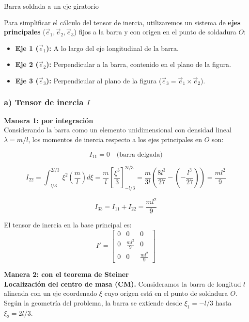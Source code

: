 \begin{solucion}{Barra soldada a un eje giratorio}

Para simplificar el cálculo del tensor de inercia, utilizaremos un sistema de \textbf{ejes principales} ($\vec{e}_1, \vec{e}_2, \vec{e}_3$) fijos a la barra y con origen en el punto de soldadura $O$:
\begin{itemize}
    \item \textbf{Eje 1 ($\vec{e}_1$):} A lo largo del eje longitudinal de la barra.
    \item \textbf{Eje 2 ($\vec{e}_2$):} Perpendicular a la barra, contenido en el plano de la figura.
    \item \textbf{Eje 3 ($\vec{e}_3$):} Perpendicular al plano de la figura ($\vec{e}_3 = \vec{e}_1 \times \vec{e}_2$).
\end{itemize}

\subsubsection*{a) Tensor de inercia $I$}

\textbf{Manera 1: por integración}\\
Considerando la barra como un elemento unidimensional con densidad lineal $\lambda = m/l$, los momentos de inercia respecto a los ejes principales en $O$ son:

$$I_{11} = 0 \quad \text{(barra delgada)}$$

$$I_{22} = \int_{-l/3}^{2l/3} \xi^2 \left( \frac{m}{l} \right) d\xi = \frac{m}{l} \left[ \frac{\xi^3}{3} \right]_{-l/3}^{2l/3} = \frac{m}{3l} \left( \frac{8l^3}{27} - \left( -\frac{l^3}{27} \right) \right) = \frac{ml^2}{9}$$

$$I_{33} = I_{11} + I_{22} = \frac{ml^2}{9}$$

El tensor de inercia en la base principal es:
\[ I' = \begin{bmatrix} 0 & 0 & 0 \\ 0 & \frac{ml^2}{9} & 0 \\ 0 & 0 & \frac{ml^2}{9} \end{bmatrix} \]

\textbf{Manera 2: con el teorema de Steiner}\\
\textbf{Localización del centro de masa (CM).} Consideramos la barra de longitud $l$ alineada con un eje coordenado $\xi$ cuyo origen está en el punto de soldadura $O$. Según la geometría del problema, la barra se extiende desde $\xi_1 = -l/3$ hasta $\xi_2 = 2l/3$.


\end{solucion}
